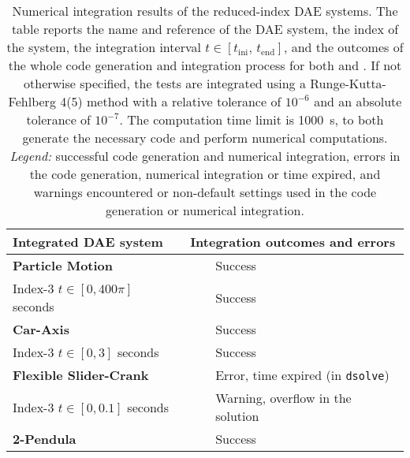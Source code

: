 \setlength\tabcolsep{2.5pt}
\setlength{\LTcapwidth}{\textwidth}
{\footnotesize\centering\begin{longtable}{lccl}
  \caption{Numerical integration results of the reduced-index \ac{DAE} systems. The table reports the name and reference of the \ac{DAE} system, the index of the system, the integration interval $t \in [t_{\text{ini}}, \, t_{\text{end}}]$, and the outcomes of the whole code generation and integration process for both \Maple{} and \Indigo{}. If not otherwise specified, the tests are integrated using a Runge-Kutta-Fehlberg 4(5) method with a relative tolerance of $10^{-6}$ and an absolute tolerance of $10^{-7}$. The computation time limit is \SI{1000}{\second}, to both generate the necessary code and perform numerical computations. \emph{Legend:} \mycheckmark{} successful code generation and numerical integration, \mycrossmark{} errors in the code generation, numerical integration or time expired, and \mywarnmark{} warnings encountered or non-default settings used in the code generation or numerical integration.}
  \label{chap3:tab:numerical_integration}
  \endfirsthead
  \endhead
  \toprule
  \textbf{Integrated \ac{DAE} system} &
  \multicolumn{3}{l}{\textbf{Integration outcomes and errors}} \\
  \midrule
  \multirow{1}{*}{\textbf{Particle Motion~\cite{campbell1995constraint}}}
    & \Maple{}  & \mycheckmark{}\phantom{\mywarnmark{}} & Success \\ \cmidrule(l{4pt}){2-4}
    Index-3 \quad $t \in [0, 400\pi]$ seconds & \Indigo{} & \mycheckmark{}\phantom{\mywarnmark{}} & Success \\ \midrule
  \multirow{1}{*}{\textbf{Car-Axis~\cite{lioen1998test, mazzia2008test}}}
    & \Maple{}  & \mycheckmark{}\phantom{\mywarnmark{}} & Success \\ \cmidrule(l{4pt}){2-4}
    Index-3 \quad $t \in [0, 3]$ seconds & \Indigo{} & \mycheckmark{}\phantom{\mywarnmark{}} & Success \\ \midrule
    \multirow{1}{*}{\textbf{Flexible Slider-Crank~\cite{lioen1998test, mazzia2008test}}}
    & \Maple{}  & \mycrossmark{}\phantom{\mywarnmark{}} & Error, time expired (in \texttt{dsolve}) \\ \cmidrule(l{4pt}){2-4}
    Index-3 \quad $t \in [0, 0.1]$ seconds & \Indigo{} & \mycheckmark{}\mywarnmark{} & Warning, overflow in the solution \\ \midrule
  \multirow{1}{*}{\textbf{2-Pendula~\cite{pryce1998solving}}}
    & \Maple{}  & \mycheckmark{}\phantom{\mywarnmark{}} & Success \\ \cmidrule(l{4pt}){2-4}

\end{longtable}}
